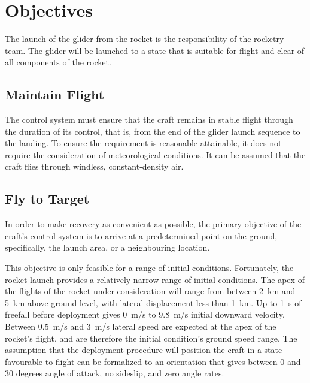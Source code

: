 \documentclass{sydeStyle}
\begin{document}
\chapter{Objectives}
\label{sec:objs}

The launch of the glider from the rocket is the responsibility of the rocketry
team. The glider will be launched to a state that is suitable for flight and
clear of all components of the rocket.

\section{Maintain Flight}
\label{sec:obj1}

The control system must ensure that the craft remains in stable flight through
the duration of its control, that is, from the end of the glider launch sequence
to the landing. To ensure the requirement is reasonable attainable, it does not
require the consideration of meteorological conditions. It can be assumed that
the craft flies through windless, constant-density air.

\section{Fly to Target}
\label{sec:obj2}

In order to make recovery as convenient as possible, the primary objective of
the craft's control system is to arrive at a predetermined point on the ground,
specifically, the launch area, or a neighbouring location.

This objective is only feasible for a range of initial conditions. Fortunately,
the rocket launch provides a relatively narrow range of initial conditions. The
apex of the flights of the rocket under consideration will range from between
2~km and 5~km above ground level, with lateral displacement less than 1~km. Up
to 1~s of freefall before deployment gives 0~m/s to 9.8~m/s initial downward
velocity. Between 0.5~m/s and 3~m/s lateral speed are expected at the apex of
the rocket's flight, and are therefore the initial condition's ground speed
range. The assumption that the deployment procedure will position the craft in
a state favourable to flight can be formalized to an orientation that gives
between 0 and 30 degrees angle of attack, no sideslip, and zero angle rates.
\end{document}
